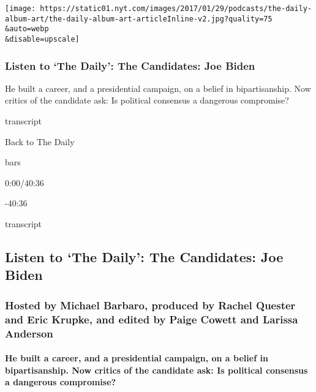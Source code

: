 \texttt{[image: https://static01.nyt.com/images/2017/01/29/podcasts/the-daily-album-art/the-daily-album-art-articleInline-v2.jpg?quality=75\\\&auto=webp\\\&disable=upscale]}

\hypertarget{listen-to-the-daily-the-candidates-joe-biden}{%
\subsubsection{Listen to `The Daily': The Candidates: Joe
Biden}\label{listen-to-the-daily-the-candidates-joe-biden}}

He built a career, and a presidential campaign, on a belief in
bipartisanship. Now critics of the candidate ask: Is political consensus
a dangerous compromise?

transcript

Back to The Daily

bars

0:00/40:36

-40:36

transcript

\hypertarget{listen-to-the-daily-the-candidates-joe-biden-1}{%
\subsection{Listen to `The Daily': The Candidates: Joe
Biden}\label{listen-to-the-daily-the-candidates-joe-biden-1}}

\hypertarget{hosted-by-michael-barbaro-produced-by-rachel-quester-and-eric-krupke-and-edited-by-paige-cowett-and-larissa-anderson}{%
\subsubsection{Hosted by Michael Barbaro, produced by Rachel Quester and
Eric Krupke, and edited by Paige Cowett and Larissa
Anderson}\label{hosted-by-michael-barbaro-produced-by-rachel-quester-and-eric-krupke-and-edited-by-paige-cowett-and-larissa-anderson}}

\hypertarget{he-built-a-career-and-a-presidential-campaign-on-a-belief-in-bipartisanship-now-critics-of-the-candidate-ask-is-political-consensus-a-dangerous-compromise}{%
\paragraph{He built a career, and a presidential campaign, on a belief
in bipartisanship. Now critics of the candidate ask: Is political
consensus a dangerous
compromise?}\label{he-built-a-career-and-a-presidential-campaign-on-a-belief-in-bipartisanship-now-critics-of-the-candidate-ask-is-political-consensus-a-dangerous-compromise}}

